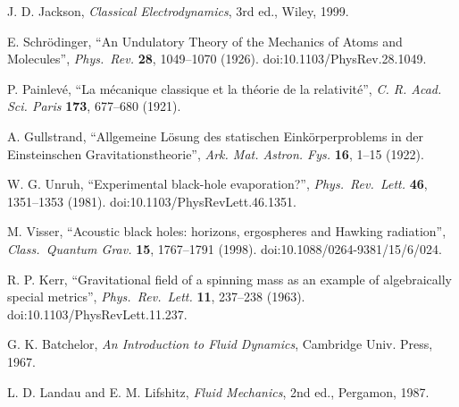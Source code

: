 \documentclass[11pt,a4paper]{article}
\begin{document}
    \begin{thebibliography}{9}
        J. D. Jackson, \emph{Classical Electrodynamics}, 3rd ed., Wiley, 1999.

        E. Schr\"odinger, ``An Undulatory Theory of the Mechanics of Atoms and Molecules'',
        \emph{Phys.\ Rev.} \textbf{28}, 1049–1070 (1926). doi:10.1103/PhysRev.28.1049.

        P. Painlev\'e, ``La m\'ecanique classique et la th\'eorie de la relativit\'e'',
        \emph{C. R. Acad. Sci. Paris} \textbf{173}, 677–680 (1921).

        A. Gullstrand, ``Allgemeine L\"osung des statischen Eink\"orperproblems in der Einsteinschen Gravitationstheorie'',
        \emph{Ark. Mat. Astron. Fys.} \textbf{16}, 1–15 (1922).

        W. G. Unruh, ``Experimental black-hole evaporation?'',
        \emph{Phys.\ Rev.\ Lett.} \textbf{46}, 1351–1353 (1981). doi:10.1103/PhysRevLett.46.1351.

        M. Visser, ``Acoustic black holes: horizons, ergospheres and Hawking radiation'',
        \emph{Class.\ Quantum Grav.} \textbf{15}, 1767–1791 (1998). doi:10.1088/0264-9381/15/6/024.

        R. P. Kerr, ``Gravitational field of a spinning mass as an example of algebraically special metrics'',
        \emph{Phys.\ Rev.\ Lett.} \textbf{11}, 237–238 (1963). doi:10.1103/PhysRevLett.11.237.

        G. K. Batchelor, \emph{An Introduction to Fluid Dynamics}, Cambridge Univ. Press, 1967.

        L. D. Landau and E. M. Lifshitz, \emph{Fluid Mechanics}, 2nd ed., Pergamon, 1987.
    \end{thebibliography}



    
    
\end{document}

